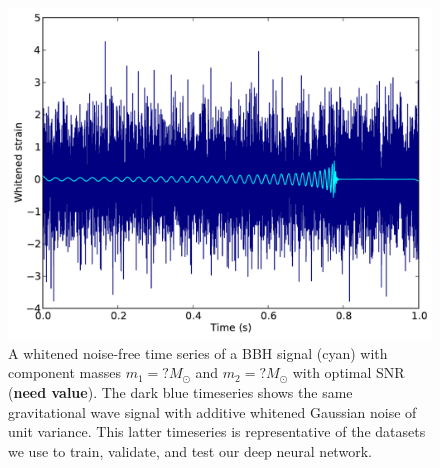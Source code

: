 \documentclass[%
 amsmath,amssymb,
 aps,
 twocolumn,
 prl,
 reprint,
floatfix,
]{revtex4-1}
\begin{document}
\begin{figure} 
\includegraphics[width=\columnwidth]{figures/waveform.pdf}
\caption{\label{fig:waveform} A whitened noise-free time series of a \ac{BBH}
signal (cyan) with component masses $m_{1}=?M_{\odot}$ and $m_{2}=?M_{\odot}$
with optimal \ac{SNR} (\textbf{need value}). The dark blue timeseries shows the
same gravitational wave signal with additive whitened Gaussian noise of unit
variance. This latter timeseries is representative of the datasets we use to
train, validate, and test our deep neural network.} 
\end{figure}
\end{document}
